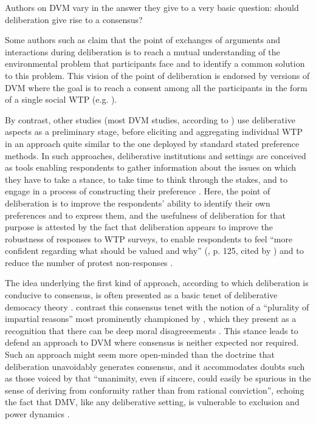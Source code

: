 \documentclass[smallextended,nospthms,natbib]{svjour3}
\begin{document}
Authors on DVM vary in the answer they give to a very basic question: should deliberation give rise to a consensus?

Some authors such as \citet{vatn_institutional_2009} claim that the point of exchanges of arguments and interactions during deliberation is to reach a mutual understanding of the environmental problem that participants face and to identify a common solution to this problem. This vision of the point of deliberation is endorsed by versions of DVM where the goal is to reach a consent among all the participants in the form of a single social WTP (e.g. \citet{orchard-webb_deliberative_2016}).

By contrast, other studies (most DVM studies, according to \citet{bunse_what_2015}) use deliberative aspects as a preliminary stage, before eliciting and aggregating individual WTP in an approach quite similar to the one deployed by standard stated preference methods. In such approaches, deliberative institutions and settings are conceived as tools enabling respondents to gather information about the issues on which they have to take a stance, to take time to think through the stakes, and to engage in a process of constructing their preference \citep{braga_preference_2005}. Here, the point of deliberation is to improve the respondents' ability to identify their own preferences and to express them, and the usefulness of deliberation for that purpose is attested by the fact that deliberation appears to improve the robustness of responses to WTP surveys, to enable respondents to feel ``more confident regarding what should be valued and why'' (\citet{svedsater_economic_2003}, p. 125, cited by \citet{bartkowski_beyond_2018}) and to reduce the number of protest non-responses \citep{szabo_reducing_2011}.

The idea underlying the first kind of approach, according to which deliberation is conducive to consensus, is often presented as a basic tenet of deliberative democacy theory \citep{wilson_discourse-based_2002}. \citet{bartkowski_beyond_2018} contrast this consensus tenet with the notion of a ``plurality of impartial reasons'' most prominently championed by \citet{sen_idea_2009}, which they present as a recognition that there can be deep moral disagreeements \citep{dryzek_deliberative_2013}. This stance leads \citet{bartkowski_beyond_2018} to defend an approach to DVM where consensus is neither expected nor required. Such an approach might seem more open-minded than the doctrine that deliberation unavoidably generates consensus, and it accommodates doubts such as those voiced by \citet{elster_sour_1983} that ``unanimity, even if sincere, could easily be spurious in the sense of deriving from conformity rather than from rational conviction'', echoing the fact that DMV, like any deliberative setting, is vulnerable to exclusion and power dynamics \citep{volker_exploring_2016,vargas_background_2016,vargas_problem_2017}.
\end{document}
